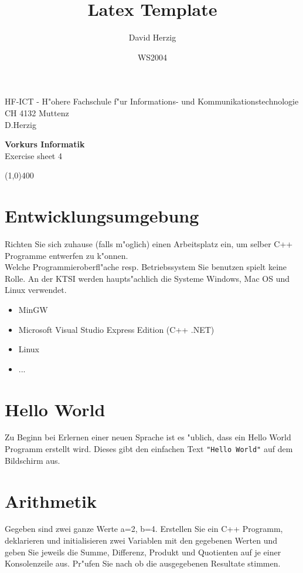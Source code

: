\documentclass[a4paper,10pt]{article}
\title{Latex Template}
\author{David Herzig}
\date{WS2004}
\begin{document}
HF-ICT - H"ohere Fachschule f"ur Informations- und Kommunikationstechnologie\\
CH 4132 Muttenz\\
D.Herzig

\vspace{2mm}

\begin{center}
{\Large \bf Vorkurs Informatik}\\
Exercise sheet 4
\end{center}

\vspace{2mm}

\line(1,0){400}

\vspace{5mm}

\section{Entwicklungsumgebung}
Richten Sie sich zuhause (falls m"oglich) einen Arbeitsplatz ein, um selber C++ Programme entwerfen zu k"onnen.\\
Welche Programmieroberfl"ache resp. Betriebssystem Sie benutzen spielt keine Rolle. An der KTSI werden haupts"achlich
die Systeme Windows, Mac OS und Linux verwendet.

\begin{itemize}
\item MinGW
\item Microsoft Visual Studio Express Edition (C++ .NET)
\item Linux
\item ...
\end{itemize}

\section{Hello World}
Zu Beginn bei Erlernen einer neuen Sprache ist es "ublich, dass ein Hello World Programm erstellt wird. Dieses gibt den einfachen Text \verb|"Hello World"| auf dem Bildschirm aus.

\section{Arithmetik}
Gegeben sind zwei ganze Werte a=2, b=4. Erstellen Sie ein C++ Programm, deklarieren und initialisieren zwei Variablen mit den gegebenen Werten und geben Sie jeweils die Summe, Differenz, Produkt und Quotienten auf je einer Konsolenzeile aus. Pr"ufen Sie nach ob die ausgegebenen Resultate stimmen.
\end{document}
